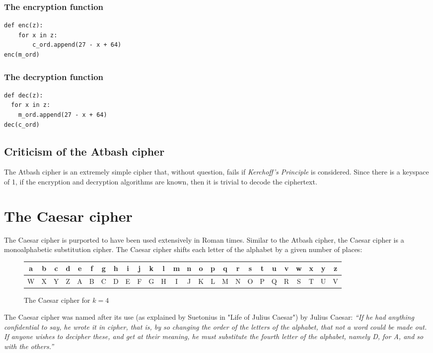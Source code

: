 \documentclass{AIAA}
\begin{document}
\subsubsection{The encryption function}
\begin{verbatim}
def enc(z):
    for x in z:
        c_ord.append(27 - x + 64)
enc(m_ord)
\end{verbatim}

\subsubsection{The decryption function}
\begin{verbatim}
def dec(z):
  for x in z:
    m_ord.append(27 - x + 64)
dec(c_ord)
\end{verbatim}

\subsection{Criticism of the Atbash cipher}
The Atbash cipher is an extremely simple cipher that, without question, fails if \textit{Kerchoff's Principle} is considered. Since there is a keyspace of 1, if the encryption and decryption algorithms are known, then it is trivial to decode the ciphertext. 

\section{The Caesar cipher}
The Caesar cipher is purported to have been used extensively in Roman times. Similar to the Atbash cipher, the Caesar cipher is a monoalphabetic substitution cipher. The Caesar cipher shifts each letter of the alphabet by a given number of places:

\begin{figure}[h!]
\begin{tabular}{|c|c|c|c|c|c|c|c|c|c|c|c|c|c|c|c|c|c|c|c|c|c|c|c|c|c|}
\hline
a & b & c & d & e & f & g & h & i & j & k & l & m & n & o & p & q & r & s & t & u & v & w & x & y & z \\ \hline
W & X & Y & Z & A & B & C & D & E & F & G & H & I & J & K & L & M & N & O & P & Q & R & S & T & U & V \\
\hline
\end{tabular}
\caption{The Caesar cipher for $k=4$}
\end{figure}
The Caesar cipher was named after its use (as explained by Suetonius in "Life of Julius Caesar") by Julius Caesar: \textit{``If he had anything confidential to say, he wrote it in cipher, that is, by so changing the order of the letters of the alphabet, that not a word could be made out. If anyone wishes to decipher these, and get at their meaning, he must substitute the fourth letter of the alphabet, namely D, for A, and so with the others.''} 
\end{document}
